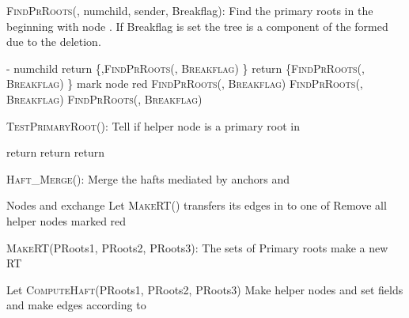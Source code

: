 \documentclass[11pt, letter]{article}
\begin{document}
\begin{algorithm}[ph!]
\caption{\textsc{FindPrRoots}(, numchild, sender, Breakflag): Find the primary roots in the  beginning
with node . If Breakflag is set the tree is  a component of the  formed due to the deletion.}
\label{algo: findprroots}
\begin{algorithmic}[1]
  \STATE  - numchild
\ENDIF
\IF{}  
  \STATE return \{,\textsc{FindPrRoots(, Breakflag)} \}
\ELSE
  \STATE return \{\textsc{FindPrRoots(, Breakflag)} \} 
  \ENDIF
\ELSE
\STATE mark node red
   \STATE \textsc{FindPrRoots(, Breakflag)}
   \STATE \textsc{FindPrRoots(, Breakflag)}
   \STATE \textsc{FindPrRoots(, Breakflag)}
\ENDIF
\ENDIF
\end{algorithmic}
\end{algorithm}



\begin{algorithm}[ph!]
\caption{\textsc{TestPrimaryRoot()}: Tell if helper node  is a primary root in  }
\label{algo: testprimaryroot}
\begin{algorithmic}[1]
\IF{} \IF{}
\STATE return 
\ELSIF{}
\STATE return 
 \ENDIF
 \ENDIF
\STATE return  
\end{algorithmic}
\end{algorithm}

\begin{algorithm}[ph!]
\caption{\textsc{Haft\_Merge()}: Merge the hafts mediated by anchors  and }
\label{algo: haftmerge}
\begin{algorithmic}[1]
\STATE Nodes  and  exchange 
\STATE Let  \textsc{MakeRT()}
 \STATE  transfers its edges in  to one of  
  \ENDIF
 \STATE Remove all helper nodes marked red 
\end{algorithmic}
\end{algorithm}


\begin{algorithm}[ph!]
\caption{\textsc{MakeRT}(PRoots1, PRoots2, PRoots3): The sets of Primary roots make a new RT }
\label{algo: makeRT}
\begin{algorithmic}[1]
  \STATE Let  \textsc{ComputeHaft}(PRoots1, PRoots2, PRoots3)
  \STATE Make helper nodes and set fields and make edges according to  
 \ENDFOR
\end{algorithmic}
\end{algorithm}
\end{document}
